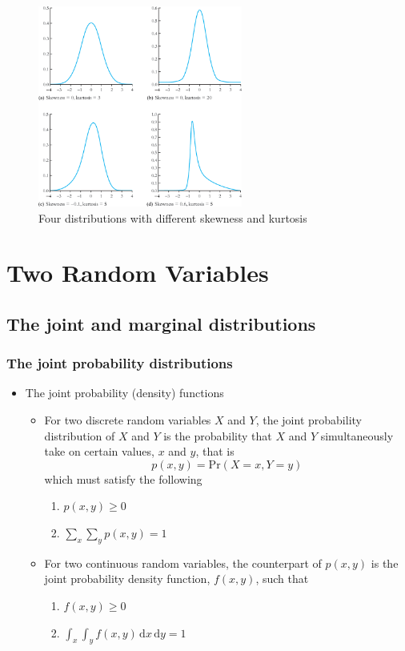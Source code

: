 \documentclass[a4paper,11pt]{article}
\newcommand{\dx}{\mathrm{d}}
\begin{document}
\begin{itemize}
\begin{figure}[htbp]
\centering
\includegraphics[width=0.6\textwidth]{figure/fig-2-3.png}
\caption{\label{fig:org989b8bd}
Four distributions with different skewness and kurtosis}
\end{figure}
\end{itemize}

\section{Two Random Variables}
\label{sec:org3723acc}
\subsection{The joint and marginal distributions}
\label{sec:org5f5c5b0}
\subsubsection*{The joint probability distributions}
\label{sec:org91ae5cb}
\begin{itemize}
\item The joint probability (density) functions
\label{sec:orgb1d5a65}

\begin{itemize}
\item For two discrete random variables \(X\) and \(Y\), the joint probability
distribution of \(X\) and \(Y\) is the probability that \(X\) and \(Y\)
simultaneously take on certain values, \(x\) and \(y\), that is
\[ p(x, y) = \mathrm{Pr}(X = x, Y = y)\]
which must satisfy the following
\begin{enumerate}
\item \(p(x, y) \geq 0\)
\item \(\sum_{x}\sum_{y} p(x, y) = 1\)
\end{enumerate}
\item For two continuous random variables, the counterpart of \(p(x, y)\) is
the joint probability density function, \(f(x, y)\), such that
\begin{enumerate}
\item \(f(x, y) \geq 0\)
\item \(\int_{x}\int_{y}f(x, y)\, \dx x\, \dx y= 1\)
\end{enumerate}
\end{itemize}
\end{itemize}
\end{document}
